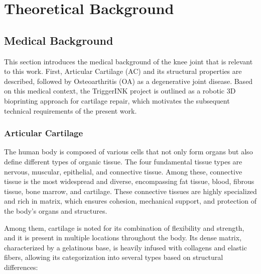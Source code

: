 \chapter{Theoretical Background}
\section{Medical Background}
This section introduces the medical background of the knee joint that is relevant to this work. First, Articular Cartilage (AC) and its structural properties are described, followed by Osteoarthritis (OA) as a degenerative joint disease. Based on this medical context, the TriggerINK project is outlined as a robotic 3D bioprinting approach for cartilage repair, which motivates the subsequent technical requirements of the present work.\cite{Yoo2024,Oliveira2017}
\subsection{Articular Cartilage}
The human body is composed of various cells that not only form organs but also define different types of organic tissue. The four fundamental tissue types are nervous, muscular, epithelial, and connective tissue. Among these, connective tissue is the most widespread and diverse, encompassing fat tissue, blood, fibrous tissue, bone marrow, and cartilage. These connective tissues are highly specialized and rich in matrix, which ensures cohesion, mechanical support, and protection of the body's organs and structures.

Among them, cartilage is noted for its combination of flexibility and strength, and it is present in multiple locations throughout the body. Its dense matrix, characterized by a gelatinous base, is heavily infused with collagens and elastic fibers, allowing its categorization into several types based on structural differences:

